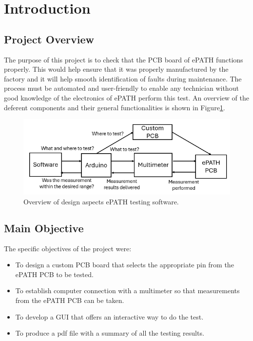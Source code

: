 \section{Introduction}
\subsection{Project Overview}
The purpose of this project is to check that the PCB board of ePATH functions properly. This would help ensure that it was properly manufactured by the factory and it will help smooth identification of faults during maintenance. The process must be automated and user-friendly to enable any technician without good knowledge of the electronics of ePATH perform this test. An overview of the deferent components and their general functionalities is shown in Figure\ref{end_goal_diagram}.


\begin{figure}[H]
          \centering
          \includegraphics[width=1\linewidth]{img/General end goal diagram.png}
          \caption{Overview of design aspects ePATH testing software.}
          \label{end_goal_diagram}
    \end{figure}

\subsection{Main Objective}
The specific objectives of the project were: 
\begin{itemize}
\item To design a custom PCB board that selects the appropriate pin from the ePATH PCB to be tested.
\item To establish computer connection with a multimeter so that measurements from the ePATH PCB can be taken.
\item To develop a GUI that offers an interactive way to do the test.
\item To produce a pdf file with a summary of all the testing results.
\end{itemize}

